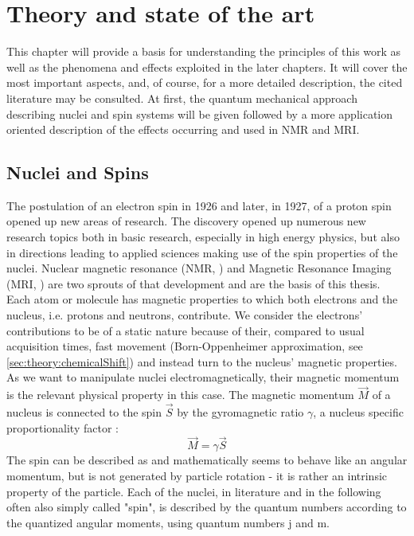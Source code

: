 \chapter{Theory and state of the art}\label{chap:theory}
This chapter will provide a basis for understanding the principles of this work as well as the phenomena and effects exploited in the later chapters. It will cover the most important aspects, and, of course, for a more detailed description, the cited literature may be consulted. At first, the quantum mechanical approach describing nuclei and spin systems will be given followed by a more application oriented description of the effects occurring and used in NMR and MRI.
    \section{Nuclei and Spins}
        \label{sec:theory:nucleiSpins}
        The postulation of an electron spin in 1926 \cite{uhlenbeck_ersetzung_1925, goudsmit_ontdekking_1971} and later, in 1927, of a proton spin \cite{dennison_note_1927} opened up new areas of research. The discovery opened up numerous new research topics both in basic research, especially in high energy physics, but also in directions leading to applied sciences making use of the spin properties of the nuclei. Nuclear magnetic resonance (NMR, \cite{purcell_resonance_1946-1} ) and Magnetic Resonance Imaging (MRI, \cite{mansfield_medical_1977}) are two sprouts of that development and are the basis of this thesis.
        Each atom or molecule has magnetic properties to which both electrons and the nucleus, i.e. protons and neutrons, contribute. We consider the electrons' contributions to be of a static nature because of their, compared to usual acquisition times, fast movement (Born-Oppenheimer approximation, see \ref{sec:theory:chemicalShift}) and instead turn to the nucleus' magnetic properties. As we want to manipulate nuclei electromagnetically, their magnetic momentum is the relevant physical property in this case.
        The magnetic momentum $\vec M$ of a nucleus is connected to the spin $\vec S$ by the gyromagnetic ratio $\gamma$, a nucleus specific proportionality factor \cite{balanis_advanced_nodate}:
        \begin{equation}
            \vec M = \gamma \vec S
            \label{eq:gyromagneticRatio}
        \end{equation}
        The spin can be described as and mathematically seems to behave like an angular momentum, but is not generated by particle rotation - it is rather an intrinsic property of the particle. Each of the nuclei, in literature and in the following often also simply called "spin", is described by the quantum numbers according to the quantized angular moments, using quantum numbers j and m.
